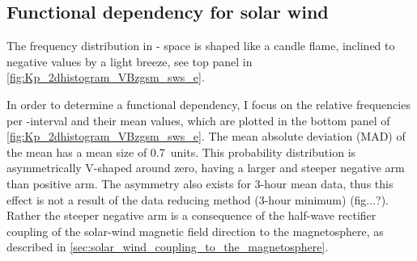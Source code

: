 \subsection{Functional dependency for solar wind}
The frequency distribution in \Kp-\vBz{} space is shaped like a candle flame, inclined to negative values by a light breeze, see top panel in \autoref{fig:Kp_2dhistogram_VBzgsm_sws_e}.
\begin{figure}
\end{figure}
In order to determine a functional dependency, I focus on the relative frequencies per \vBz-interval and their mean \Kp{} values, which are plotted in the bottom panel of \autoref{fig:Kp_2dhistogram_VBzgsm_sws_e}. The mean absolute deviation (MAD) of the mean has a mean size of \SI{0.7}{\Kp}~units. This probability distribution is asymmetrically V-shaped around zero, having a larger and steeper negative arm than positive arm. The asymmetry also exists for 3-hour mean data, thus this effect is not a result of the data reducing method (3-hour minimum) (fig...?). Rather the steeper negative arm is a consequence of the half-wave rectifier coupling of the solar-wind magnetic field direction to the magnetosphere, as described in \autoref{sec:solar_wind_coupling_to_the_magnetosphere}.\\

